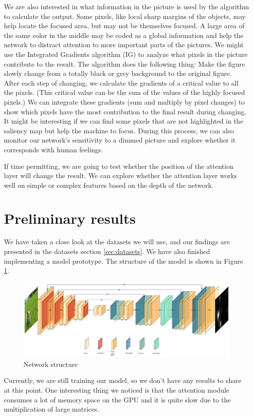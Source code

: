 \documentclass[12pt]{article}
\begin{document}
We are also interested in what information in the picture is used by the algorithm to calculate the output. Some pixels, like local sharp margins of the objects, may help locate the focused area, but may not be themselves focused. A large area of the same color in the middle may be coded as a global information and help the network to distract attention to more important parts of the pictures.
We might use the Integrated Gradients algorithm (IG) \cite{sundararajan2017axiomatic} to analyze what pixels in the picture contribute to the result. The algorithm does the following thing: Make the figure slowly change from a totally black or grey background to the original figure.
After each step of changing, we calculate the gradients of a critical value to all the pixels. (This critical value can be the sum of the values of the highly focused pixels.) We can integrate these gradients (sum and multiply by pixel changes) to show which pixels have the most contribution to the final result during changing.
It might be interesting if we can find some pixels that are not highlighted in the saliency map but help the machine to focus.
During this process, we can also monitor our network's sensitivity to a dimmed picture and explore whether it corresponds with human feelings.

If time permitting, we are going to test whether the position of the attention layer will change the result. We can explore whether the attention layer works well on simple or complex features based on the depth of the network.

\section{Preliminary results}
We have taken a close look at the datasets we will use, and our findings are presented
in the datasets section \ref{sec:datasets}. We have also finished implementing a model prototype.
The structure of the model is shown in Figure \ref{img:network}.
\begin{figure}[!h]
    \centering
    \includegraphics[width=7in]{imgs/network.pdf}
    \caption{Network structure}
    \label{img:network}
\end{figure}
Currently, we are still training our model, so we don't have any results to share at this point.
One interesting thing we noticed is that the attention module consumes a lot of memory space
on the GPU and it is quite slow due to the multiplication of large matrices.
\end{document}
